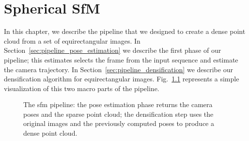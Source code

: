 \chapter{Spherical SfM}

In this chapter, we describe the pipeline that we designed to create a dense 
point cloud from a set of equirectangular images.
In Section~\ref{sec:pipeline_pose_estimation} we describe the first phase of our
pipeline; this estimates selects the frame from the input sequence and estimate
the camera trajectory. In Section~\ref{sec:pipeline_densification} we describe 
our densification algorithm for equirectangular images.
Fig.~\ref{fig:pipeline_overview}
represents a simple visualization of this two macro parts of the 
pipeline.
\begin{figure}
    \centering
    \def\svgwidth{\columnwidth}
    
    \caption{The sfm pipeline: the pose estimation phase returns the camera 
    poses and the sparse point cloud; the densification step uses 
    the original images and the previously computed poses to produce a dense 
    point cloud.}
	\label{fig:pipeline_overview}
\end{figure}

